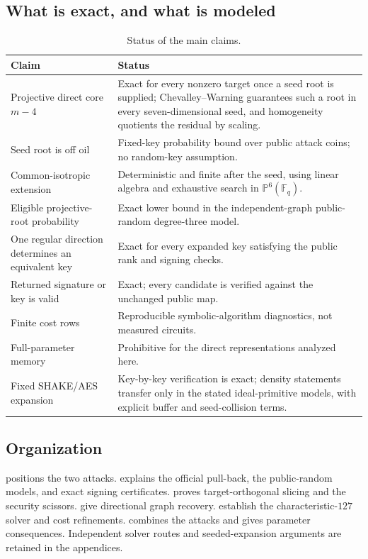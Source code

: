 \documentclass[11pt,a4paper]{article}
\theoremstyle{definition}
\theoremstyle{remark}
\newcommand{\F}{\mathbb F}
\newcommand{\PP}{\mathbb P}
\begin{document}
\subsection*{What is exact, and what is modeled}
\begin{table}[t]
\centering
\small
\caption{Status of the main claims.}
\label{tab:claim-status-final}
\begin{tabularx}{\textwidth}{@{}p{}X@{}}
\toprule
Claim & Status \\
\midrule
Projective direct core $m-4$ & Exact for every nonzero target once a seed root is supplied; Chevalley--Warning guarantees such a root in every seven-dimensional seed, and homogeneity quotients the residual by scaling. \\
Seed root is off oil & Fixed-key probability bound over public attack coins; no random-key assumption. \\
Common-isotropic extension & Deterministic and finite after the seed, using linear algebra and exhaustive search in $\PP^6(\F_q)$. \\
Eligible projective-root probability & Exact lower bound in the independent-graph public-random degree-three model. \\
One regular direction determines an equivalent key & Exact for every expanded key satisfying the public rank and signing checks. \\
Returned signature or key is valid & Exact; every candidate is verified against the unchanged public map. \\
Finite cost rows & Reproducible symbolic-algorithm diagnostics, not measured circuits. \\
Full-parameter memory & Prohibitive for the direct representations analyzed here. \\
Fixed SHAKE/AES expansion & Key-by-key verification is exact; density statements transfer only in the stated ideal-primitive models, with explicit buffer and seed-collision terms. \\
\bottomrule
\end{tabularx}
\end{table}

\subsection*{Organization}
 positions the two attacks.   explains the
official pull-back, the public-random models, and exact signing certificates.
 proves target-orthogonal slicing and the security scissors.
 give directional graph recovery.
 establish the
characteristic-$127$ solver and cost refinements.   combines
the attacks and gives parameter consequences.  Independent solver routes and
seeded-expansion arguments are retained in the appendices.
\end{document}
